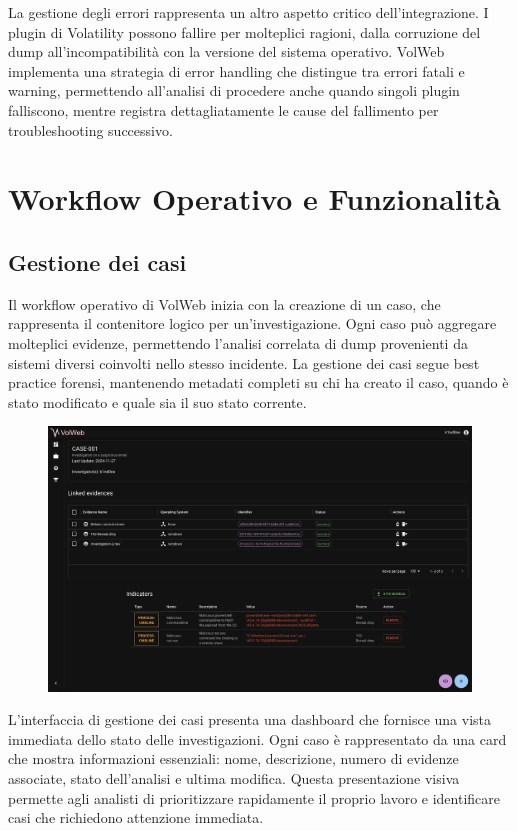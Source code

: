 La gestione degli errori rappresenta un altro aspetto critico dell'integrazione. I plugin di Volatility possono fallire per molteplici ragioni, dalla corruzione del dump all'incompatibilità con la versione del sistema operativo. VolWeb implementa una strategia di error handling che distingue tra errori fatali e warning, permettendo all'analisi di procedere anche quando singoli plugin falliscono, mentre registra dettagliatamente le cause del fallimento per troubleshooting successivo.

\section{Workflow Operativo e Funzionalità}

\subsection{Gestione dei casi}

Il workflow operativo di VolWeb inizia con la creazione di un caso, che rappresenta il contenitore logico per un'investigazione. Ogni caso può aggregare molteplici evidenze, permettendo l'analisi correlata di dump provenienti da sistemi diversi coinvolti nello stesso incidente. La gestione dei casi segue best practice forensi, mantenendo metadati completi su chi ha creato il caso, quando è stato modificato e quale sia il suo stato corrente.

\begin{figure}[H]
    \centering
    \includegraphics[width=1\linewidth]{images/volweb-original/volweb-case-management.png}
\end{figure}

L'interfaccia di gestione dei casi presenta una dashboard che fornisce una vista immediata dello stato delle investigazioni. Ogni caso è rappresentato da una card che mostra informazioni essenziali: nome, descrizione, numero di evidenze associate, stato dell'analisi e ultima modifica. Questa presentazione visiva permette agli analisti di prioritizzare rapidamente il proprio lavoro e identificare casi che richiedono attenzione immediata.

